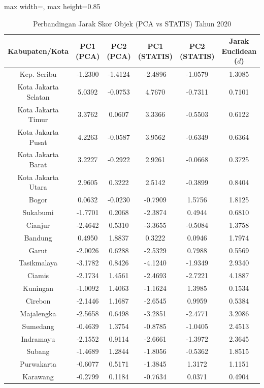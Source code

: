 \begin{table}[H]
\centering
\caption{Perbandingan Jarak Skor Objek (PCA vs STATIS) Tahun 2020} \label{tab:app1jarak_skor_2020}
\begin{adjustbox}{max width=\textwidth, max height=0.85\textheight}
\begin{tabular}{|c|c|c|c|c|c|}
\hline
\textbf{Kabupaten/Kota} & \textbf{PC1 (PCA)} & \textbf{PC2 (PCA)} & \textbf{PC1 (STATIS)} & \textbf{PC2 (STATIS)} & \textbf{Jarak Euclidean ($d$)} \\
\hline
Kep. Seribu & -1.2300 & -1.4124 & -2.4896 & -1.0579 & 1.3085 \\
Kota Jakarta Selatan & 5.0392 & -0.0753 & 4.7670 & -0.7311 & 0.7101 \\
Kota Jakarta Timur & 3.3762 & 0.0607 & 3.3366 & -0.5503 & 0.6122 \\
Kota Jakarta Pusat & 4.2263 & -0.0587 & 3.9562 & -0.6349 & 0.6364 \\
Kota Jakarta Barat & 3.2227 & -0.2922 & 2.9261 & -0.0668 & 0.3725 \\
Kota Jakarta Utara & 2.9605 & 0.3222 & 2.5142 & -0.3899 & 0.8404 \\
Bogor & 0.0632 & -0.0230 & -0.7909 & 1.5756 & 1.8125 \\
Sukabumi & -1.7701 & 0.2068 & -2.3874 & 0.4944 & 0.6810 \\
Cianjur & -2.4642 & 0.5310 & -3.3655 & -0.5084 & 1.3758 \\
Bandung & 0.4950 & 1.8837 & 0.3222 & 0.0946 & 1.7974 \\
Garut & -2.0026 & 0.6288 & -2.5329 & 0.7988 & 0.5569 \\
Tasikmalaya & -3.1782 & 0.8426 & -4.1240 & -1.9349 & 2.9340 \\
Ciamis & -2.1734 & 1.4561 & -2.4693 & -2.7221 & 4.1887 \\
Kuningan & -1.0092 & 1.4063 & -1.1624 & 1.3985 & 0.1534 \\
Cirebon & -2.1446 & 1.1687 & -2.6545 & 0.9959 & 0.5384 \\
Majalengka & -2.5658 & 0.6498 & -3.2851 & -2.4771 & 3.2086 \\
Sumedang & -0.4639 & 1.3754 & -0.8785 & -1.0405 & 2.4513 \\
Indramayu & -2.1552 & 0.9114 & -2.6661 & -1.3972 & 2.3645 \\
Subang & -1.4689 & 1.2844 & -1.8056 & -0.5362 & 1.8515 \\
Purwakarta & -0.6077 & 0.5171 & -1.3845 & 1.3172 & 1.1151 \\
Karawang & -0.2799 & 0.1184 & -0.7634 & 0.0371 & 0.4904 \\

\end{tabular}
\end{adjustbox}
\end{table}
